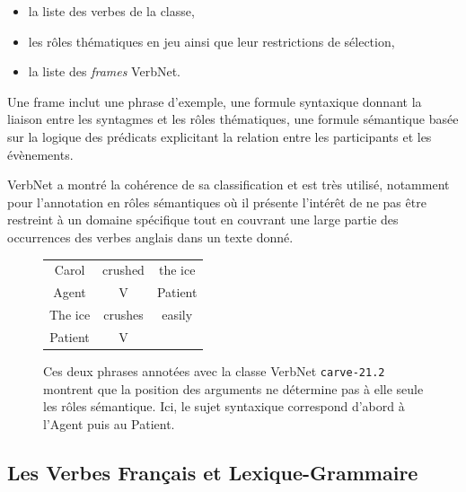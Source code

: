 \begin{itemize}
        \item la liste des verbes de la classe,
        \item les rôles thématiques en jeu ainsi que leur restrictions de sélection,
        \item la liste des \emph{frames} VerbNet.
\end{itemize}

Une frame inclut une phrase d'exemple, une formule syntaxique donnant la
liaison entre les syntagmes et les rôles thématiques, une formule sémantique
basée sur la logique des prédicats explicitant la relation entre les
participants et les évènements.



 VerbNet a montré la cohérence de sa classification et est très
utilisé, notamment pour l'annotation en rôles sémantiques
\citep{swier2005exploiting,palmer2013semantic} où il présente l'intérêt de ne
pas être restreint à un domaine spécifique tout en couvrant une large partie
des occurrences des verbes anglais dans un texte donné.

\begin{figure}[ht]
    \centering
    \begin{tabular}{ccc}
        \toprule
        Carol & crushed   & the ice \\
        Agent & V         & Patient \\
        \midrule
        The ice & crushes & easily  \\
        Patient & V       &         \\
        \bottomrule
    \end{tabular}

    \caption{\label{fig:example_srl}Ces deux phrases annotées avec la classe
    VerbNet \texttt{carve-21.2} montrent que la position des arguments ne
détermine pas à elle seule les rôles sémantique. Ici, le sujet syntaxique
correspond d'abord à l'Agent puis au Patient.}

\end{figure}


\subsection{Les Verbes Français et Lexique-Grammaire}
\label{sec:lvflg}

